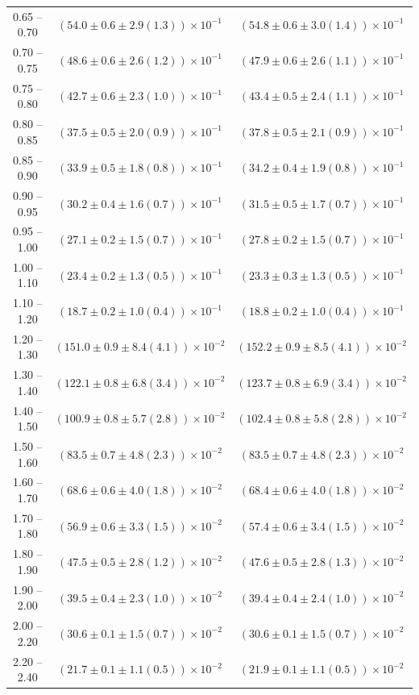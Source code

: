 \begin{table}
\begin{center}
\begin{tabular}{ c | c c }
0.65 -- 0.70 & $(54.0\pm0.6\pm2.9(1.3))\times10^{-1}$ & $(54.8\pm0.6\pm3.0(1.4))\times10^{-1}$ \\ 
0.70 -- 0.75 & $(48.6\pm0.6\pm2.6(1.2))\times10^{-1}$ & $(47.9\pm0.6\pm2.6(1.1))\times10^{-1}$ \\ 
0.75 -- 0.80 & $(42.7\pm0.6\pm2.3(1.0))\times10^{-1}$ & $(43.4\pm0.5\pm2.4(1.1))\times10^{-1}$ \\ 
0.80 -- 0.85 & $(37.5\pm0.5\pm2.0(0.9))\times10^{-1}$ & $(37.8\pm0.5\pm2.1(0.9))\times10^{-1}$ \\ 
0.85 -- 0.90 & $(33.9\pm0.5\pm1.8(0.8))\times10^{-1}$ & $(34.2\pm0.4\pm1.9(0.8))\times10^{-1}$ \\ 
0.90 -- 0.95 & $(30.2\pm0.4\pm1.6(0.7))\times10^{-1}$ & $(31.5\pm0.5\pm1.7(0.7))\times10^{-1}$ \\ 
0.95 -- 1.00 & $(27.1\pm0.2\pm1.5(0.7))\times10^{-1}$ & $(27.8\pm0.2\pm1.5(0.7))\times10^{-1}$ \\ 
1.00 -- 1.10 & $(23.4\pm0.2\pm1.3(0.5))\times10^{-1}$ & $(23.3\pm0.3\pm1.3(0.5))\times10^{-1}$ \\ 
1.10 -- 1.20 & $(18.7\pm0.2\pm1.0(0.4))\times10^{-1}$ & $(18.8\pm0.2\pm1.0(0.4))\times10^{-1}$ \\ 
1.20 -- 1.30 & $(151.0\pm0.9\pm8.4(4.1))\times10^{-2}$ & $(152.2\pm0.9\pm8.5(4.1))\times10^{-2}$ \\ 
1.30 -- 1.40 & $(122.1\pm0.8\pm6.8(3.4))\times10^{-2}$ & $(123.7\pm0.8\pm6.9(3.4))\times10^{-2}$ \\ 
1.40 -- 1.50 & $(100.9\pm0.8\pm5.7(2.8))\times10^{-2}$ & $(102.4\pm0.8\pm5.8(2.8))\times10^{-2}$ \\ 
1.50 -- 1.60 & $(83.5\pm0.7\pm4.8(2.3))\times10^{-2}$ & $(83.5\pm0.7\pm4.8(2.3))\times10^{-2}$ \\ 
1.60 -- 1.70 & $(68.6\pm0.6\pm4.0(1.8))\times10^{-2}$ & $(68.4\pm0.6\pm4.0(1.8))\times10^{-2}$ \\ 
1.70 -- 1.80 & $(56.9\pm0.6\pm3.3(1.5))\times10^{-2}$ & $(57.4\pm0.6\pm3.4(1.5))\times10^{-2}$ \\ 
1.80 -- 1.90 & $(47.5\pm0.5\pm2.8(1.2))\times10^{-2}$ & $(47.6\pm0.5\pm2.8(1.3))\times10^{-2}$ \\ 
1.90 -- 2.00 & $(39.5\pm0.4\pm2.3(1.0))\times10^{-2}$ & $(39.4\pm0.4\pm2.4(1.0))\times10^{-2}$ \\ 
2.00 -- 2.20 & $(30.6\pm0.1\pm1.5(0.7))\times10^{-2}$ & $(30.6\pm0.1\pm1.5(0.7))\times10^{-2}$ \\ 
2.20 -- 2.40 & $(21.7\pm0.1\pm1.1(0.5))\times10^{-2}$ & $(21.9\pm0.1\pm1.1(0.5))\times10^{-2}$ \\ 

\end{tabular}
\end{center}
\end{table}
